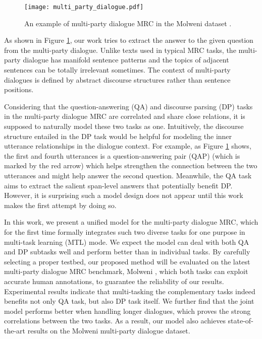 \documentclass[11pt]{article}
\begin{document}
\begin{figure}
		\centering
		\texttt{[image: multi\_party\_dialogue.pdf]}
		\caption{\label{fig:introduction example}An example of multi-party dialogue MRC in the Molweni dataset \cite{li-etal-2020-molweni}.}
\end{figure}
As shown in Figure \ref{fig:introduction example}, our work tries to extract the answer to the given question from the multi-party dialogue. Unlike texts used in typical MRC tasks, the multi-party dialogue has manifold sentence patterns and the topics of adjacent sentences can be totally irrelevant sometimes. The context of multi-party dialogues is defined by abstract discourse structures rather than sentence positions. 




Considering that the question-answering (QA) and discourse parsing (DP) tasks in the multi-party dialogue MRC are correlated and share close relations, it is supposed to naturally model these two tasks as one. Intuitively, the discourse structure entailed in the DP task would be helpful for modeling the inner utterance relationships in the dialogue context. For example, as Figure \ref{fig:introduction example} shows, the first and fourth utterances is a question-answering pair (QAP) (which is marked by the red arrow) which helps strengthen the connection between the two utterances and might help answer the second question. Meanwhile, the QA task aims to extract the salient span-level answers that potentially benefit DP. However, it is surprising such a model design does not appear until this work makes the first attempt by doing so. 


In this work, we present a unified model for the multi-party dialogue MRC, which for the first time formally integrates such two diverse tasks for one purpose in multi-task learning (MTL) mode. We expect the model can deal with both QA and DP subtasks well and perform better than in individual tasks. By carefully selecting a proper testbed, our proposed method will be evaluated on the latest multi-party dialogue MRC benchmark, Molweni \cite{li-etal-2020-molweni}, which both tasks can exploit accurate human annotations, to guarantee the reliability of our results. Experimental results indicate that multi-tasking the complementary tasks indeed benefits not only QA task, but also DP task itself. We further find that the joint model performs better when handling longer dialogues, which proves the strong correlations between the two tasks. As a result, our model also achieves state-of-the-art results on the Molweni multi-party dialogue dataset.
\end{document}
